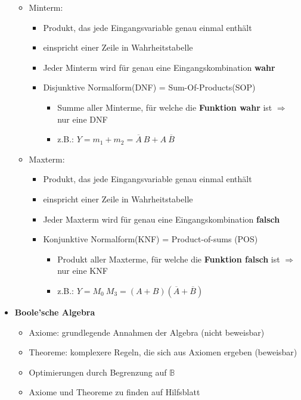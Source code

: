 \documentclass[11pt,a4paper]{article}
\begin{document}
\begin{itemize}
\begin{itemize}
	 \item Minterm:
	 	\begin{itemize}
	 	\item Produkt, das jede Eingangsvariable genau einmal enthält
	 	\item einspricht einer Zeile in Wahrheitstabelle
	 	\item Jeder Minterm wird für genau eine Eingangskombination \textbf{wahr}
	 	\item Disjunktive Normalform(DNF) = Sum-Of-Products(SOP)
	 		\begin{itemize}
	 		\item Summe aller Minterme, für welche die \textbf{Funktion wahr} ist $\Rightarrow$ nur eine DNF
	 		\item z.B.: $Y = m_1+m_2= \overline{A}~B + A ~ \overline{B}$
	 		\end{itemize}
		\end{itemize}	 		
	
	\item Maxterm:
		\begin{itemize}
	 	\item Produkt, das jede Eingangsvariable genau einmal enthält
	 	\item einspricht einer Zeile in Wahrheitstabelle
	 	\item Jeder Maxterm wird für genau eine Eingangskombination \textbf{falsch}
	 	\item Konjunktive Normalform(KNF) = Product-of-sums (POS)
	 		\begin{itemize}
	 		\item Produkt aller Maxterme, für welche die \textbf{Funktion falsch} ist $\Rightarrow$ nur eine KNF
	 		\item z.B.: $Y=M_0~M_3=(A+B)(\overline{A} + \overline{B})$
	 		\end{itemize}
		\end{itemize}
	

	\end{itemize}
	
\item \textbf{Boole'sche Algebra}
	\begin{itemize}
	\item Axiome: grundlegende Annahmen der Algebra (nicht beweisbar)
	\item Theoreme: komplexere Regeln, die sich aus Axiomen ergeben (beweisbar)
	\item Optimierungen durch Begrenzung auf $\mathbb{B}$
	\item Axiome und Theoreme zu finden auf Hilfsblatt
	\end{itemize}
	

\end{itemize}
\end{document}
